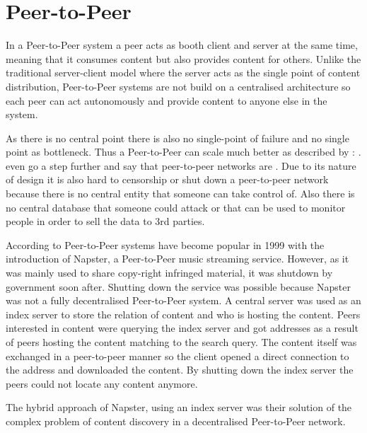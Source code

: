 \section{Peer-to-Peer}
In a Peer-to-Peer system a peer acts as booth client and server at the same time, meaning that it consumes content but also provides content for others. Unlike the traditional server-client model where the server acts as the single point of content distribution, Peer-to-Peer systems are not build on a centralised architecture so each peer can act autonomously and provide content to anyone else in the system.

As there is no central point there is also no single-point of failure and no single point as bottleneck. Thus a Peer-to-Peer can scale much better as described by \citet[\S1]{newscast-gossiping}:
. \citet[\S7.5.4]{tanenbaum_wetherall_2011} even go a step further and say that peer-to-peer networks are .
Due to its nature of design it is also hard to censorship or shut down a peer-to-peer network because there is no central entity that someone can take control of. Also there is no central database that someone could attack or that can be used to monitor people in order to sell the data to 3rd parties.

According to \citet{tanenbaum_wetherall_2011} Peer-to-Peer systems have become popular in 1999 with the introduction of Napster, a Peer-to-Peer music streaming service. However, as it was mainly used to share copy-right infringed material, it was shutdown by government soon after. Shutting down the service was possible because Napster was not a fully decentralised Peer-to-Peer system. A central server was used as an index server to store the relation of content and who is hosting the content. Peers interested in content were querying the index server and got addresses as a result of peers hosting the content matching to the search query. The content itself was exchanged in a peer-to-peer manner so the client opened a direct connection to the address and downloaded the content. By shutting down the index server the peers could not locate any content anymore. 

The hybrid approach of Napster, using an index server was their solution of the complex problem of content discovery in a decentralised Peer-to-Peer network.


